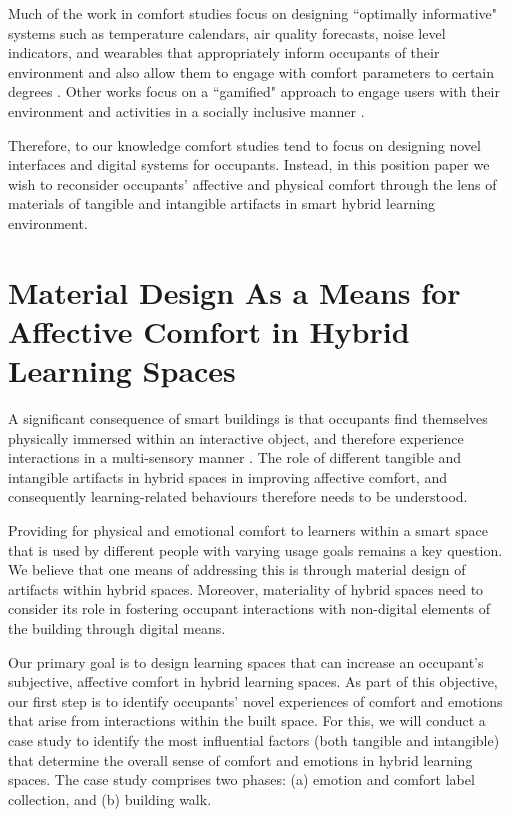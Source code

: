 \documentclass[acmconf, anonymous, review]{acmart}
\begin{document}
Much of the work in comfort studies focus on designing ``optimally informative" systems such as temperature calendars, air quality forecasts, noise level indicators, and wearables that appropriately inform occupants of their environment and also allow them to engage with comfort parameters to certain degrees  \cite{costanza2016bit, milenkovic2013improving, kim2020designing}. Other works focus on a ``gamified" approach to engage users with their environment and activities in a socially inclusive manner \cite{mathur2015tiny, kwallek1997impact, zhong2022augmenting}. 

Therefore, to our knowledge comfort studies tend to focus on designing novel interfaces and digital systems for occupants. Instead, in this position paper we wish to reconsider occupants' affective and physical comfort through the lens of materials of tangible and intangible artifacts in smart hybrid learning environment. 


\section{Material Design As a Means for Affective Comfort in Hybrid Learning Spaces}

A significant consequence of smart buildings is that occupants find themselves physically immersed within an interactive object, and therefore experience interactions in a multi-sensory manner \cite{nembrini2017human}. The role of different tangible and intangible artifacts in hybrid spaces in improving affective comfort, and consequently learning-related behaviours therefore needs to be understood.  

Providing for physical and emotional comfort to learners within a smart space that is used by different people with varying usage goals remains a key question. We believe that one means of addressing this is through material design of artifacts within hybrid spaces. Moreover, materiality of hybrid spaces need to consider its role in fostering occupant interactions with non-digital elements of the building through digital means. 

Our primary goal is to design learning spaces that can increase an occupant's subjective, affective comfort in hybrid learning spaces. As part of this objective, our first step is to identify occupants' novel experiences of comfort and emotions that arise from interactions within the built space. For this, we will conduct a case study to identify the most influential factors (both tangible and intangible) that determine the overall sense of comfort and emotions in hybrid learning spaces. The case study comprises two phases: (a) emotion and comfort label collection, and (b) building walk. 
\end{document}
